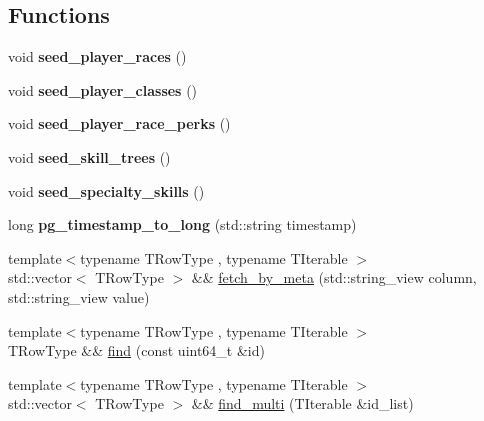 \subsection*{Functions}
\begin{DoxyCompactItemize}
\item 
\mbox{\label{namespacemods_1_1orm_a6c26de974455cf5435c916ba61b478dd}} 
void {\bfseries seed\+\_\+player\+\_\+races} ()
\item 
\mbox{\label{namespacemods_1_1orm_aa286e245a5e7b99b7141f1d9de855db4}} 
void {\bfseries seed\+\_\+player\+\_\+classes} ()
\item 
\mbox{\label{namespacemods_1_1orm_a74bca76a2a152d0be5c26fb710e43932}} 
void {\bfseries seed\+\_\+player\+\_\+race\+\_\+perks} ()
\item 
\mbox{\label{namespacemods_1_1orm_a39077006f44062eecb8fffdee413c85a}} 
void {\bfseries seed\+\_\+skill\+\_\+trees} ()
\item 
\mbox{\label{namespacemods_1_1orm_a610ad878547937a6eb07d4430a81290e}} 
void {\bfseries seed\+\_\+specialty\+\_\+skills} ()
\item 
\mbox{\label{namespacemods_1_1orm_a774302ed1cb75a0780009326395b6ae6}} 
long {\bfseries pg\+\_\+timestamp\+\_\+to\+\_\+long} (std\+::string timestamp)
\item 
{\footnotesize template$<$typename T\+Row\+Type , typename T\+Iterable $>$ }\\std\+::vector$<$ T\+Row\+Type $>$ \&\& \hyperlink{namespacemods_1_1orm_a2ab3ea4b32ee4d381314c237155249ac}{fetch\+\_\+by\+\_\+meta} (std\+::string\+\_\+view column, std\+::string\+\_\+view value)
\item 
{\footnotesize template$<$typename T\+Row\+Type , typename T\+Iterable $>$ }\\T\+Row\+Type \&\& \hyperlink{namespacemods_1_1orm_adfe5cbbffe9a35eeccfedcda9b1a7d20}{find} (const uint64\+\_\+t \&id)
\item 
{\footnotesize template$<$typename T\+Row\+Type , typename T\+Iterable $>$ }\\std\+::vector$<$ T\+Row\+Type $>$ \&\& \hyperlink{namespacemods_1_1orm_a7b55ee63e04fc5075fb1c17e6d5d17ed}{find\+\_\+multi} (T\+Iterable \&id\+\_\+list)

\end{DoxyCompactItemize}
